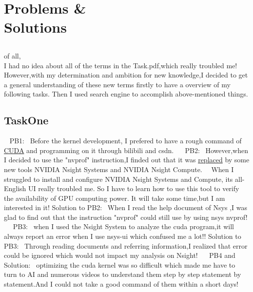\onecolumn
\section{ \LARGE Problems \& \\Solutions}

\subsection{}  of all, \\
I had no idea about all of the terms in the Task.pdf,which really troubled me!
However,with my determination and ambition for new knowledge,I decided to get a general understanding of
these new terms firstly to have a overview of my following tasks.
Then I used search engine to accomplish above-mentioned things.
\newline
\subsection{TaskOne}~\newline
PB1:~ Before the kernel development, I prefered to have a rough command of \underline{CUDA} and programming on it 
through bilibili and csdn.\newline
~\newline~
PB2:~ However,when I decided to use the "nvprof" instruction,I finded out that it was \underline{replaced}
by some new tools NVIDIA Nsight Systems and NVIDIA Nsight Compute.~~
When I struggled to install and configure NVIDIA Nsight Systems and Compute, its all-English UI really troubled me.
So I have to learn how to use this tool to verify the availability of GPU computing power.\newline
It will take some time,but I am interested in it!\newline
Solution to PB2:~ When I read the help document of Nsys ,I was glad to find out that the instruction "nvprof"
could still use by using nsys nvprof!\newline
~\newline~
PB3:~ when I used the Nsight System to analyze the cuda program,it will always report an error when I use nsys-ui
which confused me a lot!!\newline
Solution to PB3:~ Through reading documents and referring information,I realized that error could be ignored 
which would not impact my analysis on Nsight!\newline
~\newline~
PB4 and Solution:~ optimizing the cuda kernel was so difficult which made me have to turn to AI and numerous videos 
to understand them step by step statement by statement.And I could not take a good command of them within a 
short days!\newline


